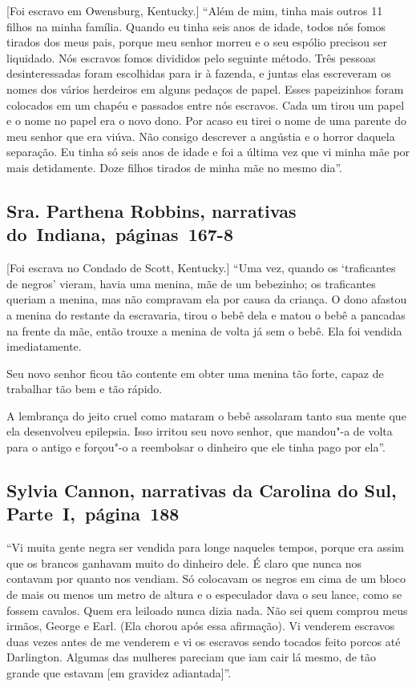 {[}Foi escravo em Owensburg, Kentucky.{]} ``Além de mim, tinha mais outros 11 filhos na minha família. Quando eu
tinha seis anos de idade, todos nós fomos tirados dos meus pais, porque
meu senhor morreu e o seu espólio precisou ser liquidado. Nós escravos
fomos divididos pelo seguinte método. Três pessoas desinteressadas foram
escolhidas para ir à fazenda, e juntas elas escreveram os nomes dos
vários herdeiros em alguns pedaços de papel. Esses papeizinhos foram
colocados em um chapéu e passados entre nós escravos. Cada um tirou um
papel e o nome no papel era o novo dono. Por acaso eu tirei o nome de
uma parente do meu senhor que era viúva. Não consigo descrever a
angústia e o horror daquela separação. Eu tinha só seis anos de idade e
foi a última vez que vi minha mãe por mais detidamente. Doze filhos %
tirados de minha mãe no mesmo dia''.

\subsection{Sra. Parthena Robbins, narrativas do~Indiana,~páginas~167-8}

{[}Foi escrava no Condado de Scott, Kentucky.{]} ``Uma vez, quando os `traficantes de negros' vieram, havia uma menina,
mãe de um bebezinho; os traficantes queriam a menina, mas não compravam
ela por causa da criança. O dono afastou a menina do restante da
escravaria, tirou o bebê dela e matou o bebê a pancadas na frente da
mãe, então trouxe a menina de volta já sem o bebê. Ela foi vendida
imediatamente.

Seu novo senhor ficou tão contente em obter uma menina tão forte, capaz
de trabalhar tão bem e tão rápido.

A lembrança do jeito cruel como mataram o bebê assolaram tanto sua mente
que ela desenvolveu epilepsia. Isso irritou seu novo senhor, que
mandou"-a de volta para o antigo e forçou"-o a reembolsar o dinheiro que
ele tinha pago por ela''.

\subsection{Sylvia Cannon, narrativas da Carolina do Sul, Parte~I,~página~188} \label{ref46}

``Vi muita gente negra ser vendida para longe naqueles tempos, porque
era assim que os brancos ganhavam muito do dinheiro dele. É claro que
nunca nos contavam por quanto nos vendiam. Só colocavam os negros em
cima de um bloco de mais ou menos um metro de altura e o especulador
dava o seu lance, como se fossem cavalos. Quem era leiloado nunca dizia
nada. Não sei quem comprou meus irmãos, George e Earl. (Ela chorou após
essa afirmação). Vi venderem escravos duas vezes antes de me venderem e
vi os escravos sendo tocados feito porcos até Darlington. Algumas das
mulheres pareciam que iam cair lá mesmo, de tão grande que estavam {[}em
gravidez adiantada{]}''.

